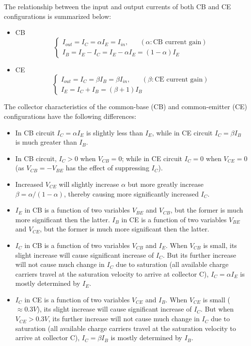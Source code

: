 The relationship between the input and output currents of both CB and CE 
configurations is summarized below:
\begin{itemize}
\item CB
  \[ 
  \left\{ \begin{array}{l}
    I_{out}=I_C=\alpha I_E=I_{in},\;\;\;\;\;\;(\alpha: \mbox{CB current gain})
    \\
    I_B=I_E-I_C=I_E-\alpha I_E=(1-\alpha)I_E
  \end{array} \right.   
  \]
\item CE
  \[ 
  \left\{ \begin{array}{l} 
    I_{out}=I_C=\beta I_B=\beta I_{in},\;\;\;\;\;\;(\beta: \mbox{CE current gain})
    \\
    I_E=I_C+I_B=(\beta+1) I_B
  \end{array} \right.   
  \]
\end{itemize}


The collector characteristics of the common-base (CB) and common-emitter 
(CE) configurations have the following differences:
\begin{itemize}
\item In CB circuit $I_C=\alpha I_E$ is slightly less than $I_E$, while 
  in CE circuit $I_C=\beta I_B$ is much greater than $I_B$.
\item In CB circuit, $I_C>0$ when $V_{CB}=0$; while in CE circuit $I_C=0$
  when $V_{CE}=0$ (as $V_{CB}=-V_{BE}$ has the effect of suppressing $I_C$).
\item Increased $V_{CE}$ will slightly increase $\alpha$ but more
  greatly increase $\beta=\alpha/(1-\alpha)$, thereby causing more 
  significantly increased $I_C$.
\item $I_E$ in CB is a function of two variables $V_{BE}$ and $V_{CB}$,
  but the former is much more significant then the latter.
  $I_B$ in CE is a function of two variables $V_{BE}$ and $V_{CE}$,
  but the former is much more significant then the latter.
\item $I_C$ in CB is a function of two variables $V_{CB}$ and $I_E$. 
  When $V_{CB}$ is small, its slight increase will cause significant increase 
  of $I_C$. But its further increase will not cause much change in $I_C$ due 
  to saturation (all available charge carriers travel at the saturation velocity
  to arrive at collector C), $I_C=\alpha I_E$ is mostly determined by $I_E$.
\item $I_C$ in CE is a function of two variables $V_{CE}$ and $I_B$. 
  When $V_{CE}$ is small ($\approx 0.3V$), its slight increase will cause 
  significant increase of $I_C$. But when $V_{CE}>0.3V$, its further increase 
  will not cause much change in $I_C$ due to saturation (all available charge 
  carriers travel at the saturation velocity to arrive at collector C), 
  $I_C=\beta I_B$ is mostly determined by $I_B$.
\end{itemize}

